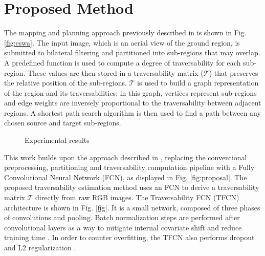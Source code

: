 \documentclass[conference]{IEEEtran}
\begin{document}
\section{Proposed Method}
\label{section:proposed-method}

The mapping and planning approach previously described in \cite{borges:2019} is shown in Fig. \ref{fig:eswa}.
The input image, which is an aerial view of the ground region, is submitted to bilateral filtering and partitioned into sub-regions that may overlap.
A predefined function is used to compute a degree of traversability for each sub-region.
These values are then stored in a traversability matrix ($\mathcal{T}$) that preserves the relative position of the sub-regions.
$\mathcal{T}$ is used to build a graph representation of the region and its traversabilities; in this graph, vertices represent sub-regions and edge weights are inversely proportional to the traversability between adjacent regions.
A shortest path search algorithm is then used to find a path between any chosen source and target sub-regions.

\begin{figure}[ht]
\centering


\vspace{0.75cm}


\caption{Experimental results}
\label{fig:flocharts}
\end{figure}

This work builds upon the approach described in \cite{borges:2019}, replacing the conventional preprocessing, partitioning and traversability computation pipeline with a Fully Convolutional Neural Network (FCN), as displayed in Fig. \ref{fig:proposal}.
The proposed traversability estimation method uses an FCN to derive a traversability matrix $\mathcal{T}$ directly from raw RGB images.
The Traversability FCN (TFCN) architecture is shown in Fig. \ref{fig}.
It is a small network, composed of three phases of convolutions and pooling.
Batch normalization steps are performed after convolutional layers as a way to mitigate internal covariate shift and reduce training time \cite{ioffe:2015}.
In order to counter overfitting, the TFCN also performs dropout \cite{srivastava:2014} and L2 regularization \cite{ng:2004}.
\end{document}
